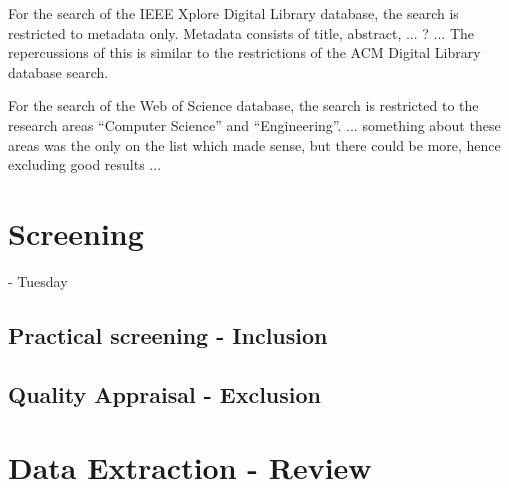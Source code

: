 For the search of the IEEE Xplore Digital Library database, the search is restricted to metadata only.
Metadata consists of title, abstract, ... ? ...
The repercussions of this is similar to the restrictions of the ACM Digital Library database search.
 
For the search of the Web of Science database, the search is restricted to the research areas “Computer Science” and “Engineering”.
... something about these areas was the only on the list which made sense, but there could be more, hence excluding good results ...

\section{Screening} - Tuesday
\subsection{Practical screening - Inclusion}



\subsection{Quality Appraisal - Exclusion}





\section{Data Extraction - Review}




